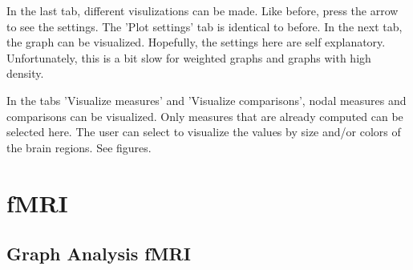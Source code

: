 \documentclass{article}
\begin{document}
In the last tab, different visulizations can be made. Like before, press the arrow to see the settings. The 'Plot settings' tab is identical to before. In the next tab, the graph can be visualized. Hopefully, the settings here are self explanatory. Unfortunately, this is a bit slow for weighted graphs and graphs with high density.

In the tabs 'Visualize measures' and 'Visualize comparisons', nodal measures and comparisons can be visualized. Only measures that are already computed can be selected here. The user can select to visualize the values by size and/or colors of the brain regions. See figures.


\section{fMRI}

\subsection{Graph Analysis fMRI}
\end{document}
